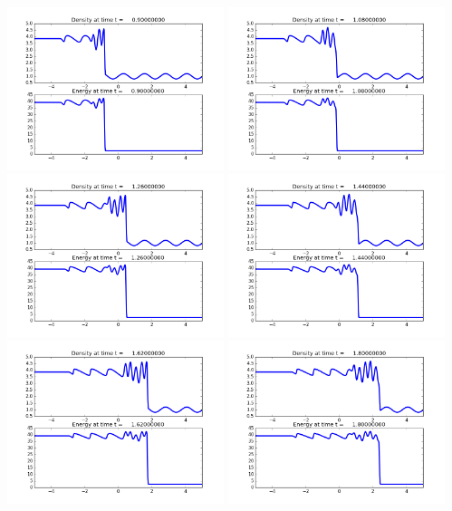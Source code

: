 \documentclass[11pt]{article}
\begin{document}
\includegraphics[width=0.475\textwidth]{frame0005fig0.png}
\vskip 10pt 
\includegraphics[width=0.475\textwidth]{frame0006fig0.png}
\includegraphics[width=0.475\textwidth]{frame0007fig0.png}
\vskip 10pt 
\includegraphics[width=0.475\textwidth]{frame0008fig0.png}
\includegraphics[width=0.475\textwidth]{frame0009fig0.png}
\vskip 10pt 
\includegraphics[width=0.475\textwidth]{frame0010fig0.png}
\end{document}
